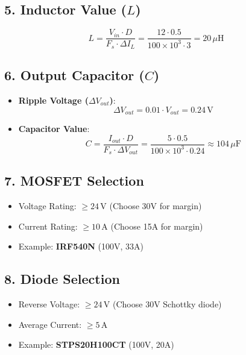 \documentclass{article}
\begin{document}
	\subsection*{5. Inductor Value (\(L\))}
	\[
	L = \frac{V_{in} \cdot D}{F_s \cdot \Delta I_L} = \frac{12 \cdot 0.5}{100 \times 10^3 \cdot 3} = 20 \, \mu\text{H}
	\]
	
	\subsection*{6. Output Capacitor (\(C\))}
	\begin{itemize}
		\item \textbf{Ripple Voltage (\(\Delta V_{out}\))}:
		\[
		\Delta V_{out} = 0.01 \cdot V_{out} = 0.24 \, \text{V}
		\]
		
		\item \textbf{Capacitor Value}:
		\[
		C = \frac{I_{out} \cdot D}{F_s \cdot \Delta V_{out}} = \frac{5 \cdot 0.5}{100 \times 10^3 \cdot 0.24} \approx 104 \, \mu\text{F}
		\]
	\end{itemize}
	
	\subsection*{7. MOSFET Selection}
	\begin{itemize}
		\item Voltage Rating: \(\geq 24 \, \text{V}\) (Choose 30V for margin)
		\item Current Rating: \(\geq 10 \, \text{A}\) (Choose 15A for margin)
		\item Example: \textbf{IRF540N} (100V, 33A)
	\end{itemize}
	
	\subsection*{8. Diode Selection}
	\begin{itemize}
		\item Reverse Voltage: \(\geq 24 \, \text{V}\) (Choose 30V Schottky diode)
		\item Average Current: \(\geq 5 \, \text{A}\)
		\item Example: \textbf{STPS20H100CT} (100V, 20A)
	\end{itemize}
	
\end{document}
